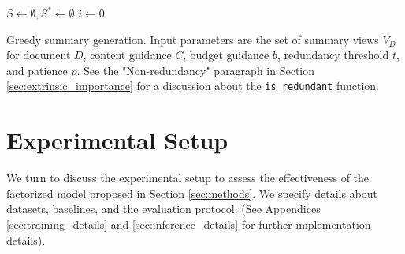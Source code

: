 \documentclass[11pt,table]{article}
\begin{document}
\begin{algorithm}[t]
    \hfill
    \begin{minipage}{0.87\linewidth}
    \small
    \SetAlgoLined
    $S \gets \emptyset, S^* \gets \emptyset$\;
    $i \gets 0$\;
    \end{minipage}

    \caption{Greedy summary generation. Input parameters are the set of summary views $V_D$ for document $D$, content guidance $C$, budget guidance $b$, redundancy threshold $t$, and patience $p$. See the "Non-redundancy" paragraph in Section \ref{sec:extrinsic_importance} for a discussion about the \texttt{is\_redundant} function.}\label{alg:greedy_summary}
\end{algorithm}

\section{Experimental Setup}
\label{sec:experiments}
We turn to discuss the experimental setup to assess the effectiveness of the factorized model proposed in Section \ref{sec:methods}. We specify details about datasets, baselines, and the evaluation protocol. (See Appendices \ref{sec:training_details} and \ref{sec:inference_details} for further implementation details).
\end{document}
